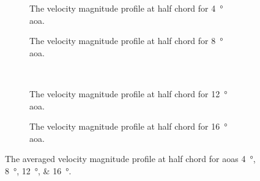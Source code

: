 \begin{figure}[htbp]
    \centering
    \begin{subfigure}{0.49\textwidth}
        \centering
        
        \caption{The velocity magnitude profile at half chord for \qty{4}{\degree} \acrshort{aoa}.}
        \label{fig:averaged_half_chord_aoa4}
    \end{subfigure}
    \begin{subfigure}{0.49\textwidth}
        \centering
        
        \caption{The velocity magnitude profile at half chord for \qty{8}{\degree} \acrshort{aoa}.}
        \label{fig:averaged_half_chord_aoa8}
    \end{subfigure} \\
    \begin{subfigure}{0.49\textwidth}
        \centering
        
        \caption{The velocity magnitude profile at half chord for \qty{12}{\degree} \acrshort{aoa}.}
        \label{fig:averaged_half_chord_aoa12}
    \end{subfigure}
    \begin{subfigure}{0.49\textwidth}
        \centering
        
        \caption{The velocity magnitude profile at half chord for \qty{16}{\degree} \acrshort{aoa}.}
        \label{fig:averaged_half_chord_aoa16}
    \end{subfigure}
    \caption{The averaged velocity magnitude profile at half chord for \acrshort{aoa}s \qtylist{4;8;12;16}{\degree}.}
    \label{fig:averaged_half_chord}
    \vspace*{3.5in}
\end{figure}